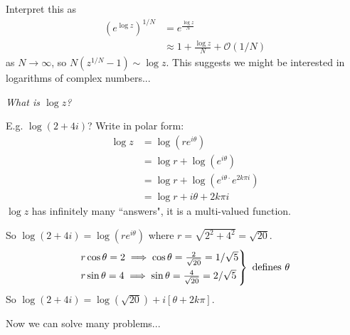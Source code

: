 \documentclass[10pt]{scrartcl}
\begin{document}
Interpret this as 
\begin{align*}
  (e^{\log z})^{1/N} &= e^{\frac{\log z}{N}}\\
  &\approx 1 + \frac{\log z}{N} + \mathcal{O}(1/N)
\end{align*}
as $N \to \infty$, so $N(z^{1/N} -1) \sim \log z$. This suggests we might be interested in logarithms of complex numbers...


\emph{What is $\log z$?} 

E.g. $\log(2 + 4i)$? Write in polar form: 
\begin{align*}
  \log z &= \log(re^{i\theta})\\
  &= \log r + \log(e^{i\theta})\\
  &= \log r + \log(e^{i\theta\cdot} e^{2k\pi i})\\
  &= \log r + i\theta + 2k\pi i 
\end{align*}
$\log z$ has infinitely many ``answers", it is a multi-valued function. 

So $\log(2 + 4i) = \log(re^{i\theta})$ where $r = \sqrt{2^2 + 4^2} = \sqrt{20}$. 
\[
  \begin{rcases*}
  r\cos\theta = 2 \implies \cos\theta = \frac{2}{\sqrt{20}} = 1/\sqrt{5}\\
  r\sin\theta = 4 \implies \sin\theta = \frac{4}{\sqrt{20}} = 2/\sqrt{5}\\	
  \end{rcases*} \mbox{ defines $\theta$}
\]
So $\log(2 + 4i) = \log(\sqrt{20}) + i[\theta + 2k\pi]$. 

Now we can solve many problems...\\
\end{document}
